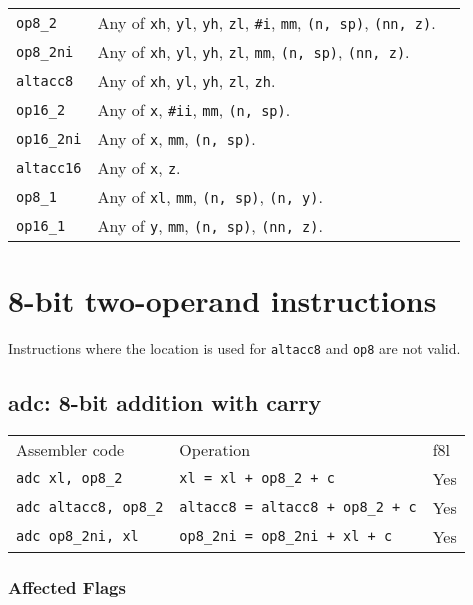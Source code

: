 \documentclass{book}
\begin{document}
\begin{tabular}{l l l}
\texttt{op8\_2} & Any of \texttt{xh}, \texttt{yl}, \texttt{yh}, \texttt{zl}, \texttt{\#i}, \texttt{mm}, \texttt{(n, sp)}, \texttt{(nn, z)}. \\
\texttt{op8\_2ni} & Any of \texttt{xh}, \texttt{yl}, \texttt{yh}, \texttt{zl}, \texttt{mm}, \texttt{(n, sp)}, \texttt{(nn, z)}. \\
\texttt{altacc8} & Any of \texttt{xh}, \texttt{yl}, \texttt{yh}, \texttt{zl}, \texttt{zh}. \\
\texttt{op16\_2} & Any of \texttt{x}, \texttt{\#ii}, \texttt{mm}, \texttt{(n, sp)}. \\
\texttt{op16\_2ni} & Any of \texttt{x}, \texttt{mm}, \texttt{(n, sp)}. \\
\texttt{altacc16} & Any of \texttt{x}, \texttt{z}. \\
\texttt{op8\_1} & Any of \texttt{xl}, \texttt{mm}, \texttt{(n, sp)}, \texttt{(n, y)}. \\
\texttt{op16\_1} & Any of \texttt{y}, \texttt{mm}, \texttt{(n, sp)}, \texttt{(nn, z)}. \\
\end{tabular}

\section{8-bit two-operand instructions}

Instructions where the location is used for \texttt{altacc8} and \texttt{op8} are not valid.

\subsection{adc: 8-bit addition with carry}

\begin{tabular}{l l l}
Assembler code               & Operation                               & f8l \\
\texttt{adc xl, op8\_2}      & \texttt{xl = xl + op8\_2 + c}           & Yes \\
\texttt{adc altacc8, op8\_2} & \texttt{altacc8 = altacc8 + op8\_2 + c} & Yes \\
\texttt{adc op8\_2ni, xl}    & \texttt{op8\_2ni = op8\_2ni + xl + c}   & Yes
\end{tabular}

\subsubsection*{Affected Flags}
\end{document}
